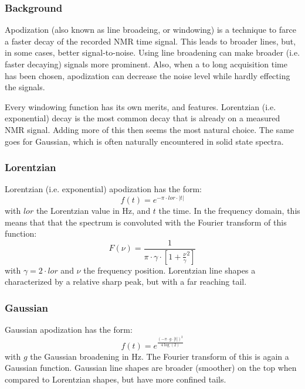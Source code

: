 \documentclass[11pt,a4paper]{article}
\begin{document}
\subsubsection{Background}
Apodization (also known as line broadeing, or windowing) is a technique to farce a faster decay of the
recorded NMR time signal. This leads to broader lines, but, in some cases, better signal-to-noise. Using line
broadening can make broader (i.e. faster decaying) signals more prominent. Also, when a to long acquisition
time has been chosen, apodization can decrease the noise level while hardly effecting the signals. 

Every windowing function has its own merits, and features. Lorentzian (i.e. exponential) decay is the most
common decay that is already on a measured NMR signal. Adding more of this then seems the most natural choice.
The same goes for Gaussian, which is often naturally encountered in solid state spectra.

\subsubsection{Lorentzian}
Lorentzian (i.e. exponential) apodization has the form:
\begin{equation}
  f(t) = e^{-\pi \cdot lor \cdot |t|}
\end{equation}
with $lor$ the Lorentzian value in Hz, and $t$ the time. In the frequency domain, this means that that the
spectrum is convoluted with the Fourier transform of this function:
\begin{equation}
  F(\nu) = \frac{1}{\pi \cdot \gamma \cdot \left[ 1 + \frac{\nu}{\gamma}^2 \right]}
\end{equation}
with $\gamma = 2 \cdot lor$ and $\nu$ the frequency position. Lorentzian line shapes a characterized by a
relative sharp peak, but with a far reaching tail. 

\subsubsection{Gaussian}
Gaussian apodization has the form:
\begin{equation}
  f(t) = e^{\frac{(-\pi \cdot g \cdot |t|)^2}{4 \log(2)} }
\end{equation}
with $g$ the Gaussian broadening in Hz. The Fourier transform of this is again a Gaussian function. Gaussian
line shapes are broader (smoother) on the top when compared to Lorentzian shapes, but have more confined
tails. 
\end{document}
